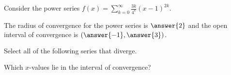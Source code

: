 \documentclass{ximera}
\author{Jim Talamo}
\begin{document}
\begin{exercise}
Consider the power series $f(x) = \sum_{k=0}^{\infty} \frac{3k}{4^k}(x-1)^{2k}$.

The radius of convergence for the power series is $\answer{2}$ and the open interval of convergence is $\left(\answer{-1},\answer{3}\right)$.

\begin{exercise}
Select all of the following series that diverge.

\begin{selectAll}
\end{selectAll}

\begin{hint}
Which $x$-values lie in the interval of convergence?
\end{hint}
\end{exercise}

\end{exercise}
\end{document}
